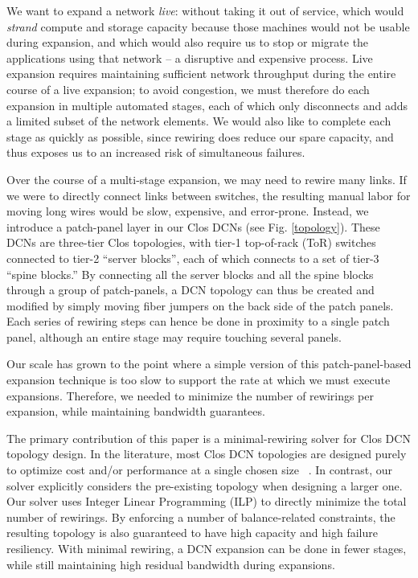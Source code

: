 \documentclass[letterpaper,twocolumn,10pt]{article}
\begin{document}
We want to expand a network \emph{live}: without taking it out of service, which would \emph{strand} compute and storage capacity because those machines would not be usable during expansion, and which would also require us to stop or migrate the applications using that network -- a disruptive and expensive process.  Live expansion requires maintaining sufficient network throughput during the entire course of a live expansion; to avoid congestion, we must therefore do each expansion in multiple automated stages, each of which only disconnects and adds a limited subset of the network elements.  We would also like to complete each stage as quickly as possible, since rewiring does reduce our spare capacity, and thus exposes us to an increased risk of simultaneous failures.

Over the course of a multi-stage expansion, we may need to rewire many links.  If we were to directly connect links between switches, the resulting manual labor for moving long wires
would be slow, expensive, and error-prone.  Instead, we introduce a patch-panel layer in our Clos DCNs (see Fig. \ref{topology}). These DCNs are three-tier Clos topologies, with tier-1 top-of-rack (ToR) switches connected to tier-2 “server blocks”, each of which connects to a set of tier-3 “spine blocks.”  By connecting all the server blocks and all the spine blocks through a group of patch-panels, a DCN topology can thus be created and modified by simply moving fiber jumpers on the back side of the patch panels.  Each series of rewiring steps can hence be done in proximity to a single patch panel, although an entire stage may require touching several panels. 

Our scale has grown to the point where a simple version of this patch-panel-based expansion technique is too slow to support the rate at which we must execute expansions.  Therefore, we needed to minimize the number of rewirings per expansion, while maintaining bandwidth guarantees.

The primary contribution of this paper is a minimal-rewiring solver for Clos DCN topology design. In the literature, most Clos DCN topologies are designed purely to optimize cost and/or performance at a single chosen size ~\cite{FatTree,VL2,WCMP,F10,Aspen}. In contrast, our solver explicitly considers the pre-existing topology when designing a larger one. Our solver uses Integer Linear \mbox{Programming} (ILP) to directly minimize the total number of rewirings. By enforcing a number of balance-related constraints, the resulting topology is also guaranteed to have high capacity and high failure resiliency. With minimal rewiring, a DCN expansion can be done in fewer stages, while still maintaining high residual bandwidth during expansions.
\end{document}
